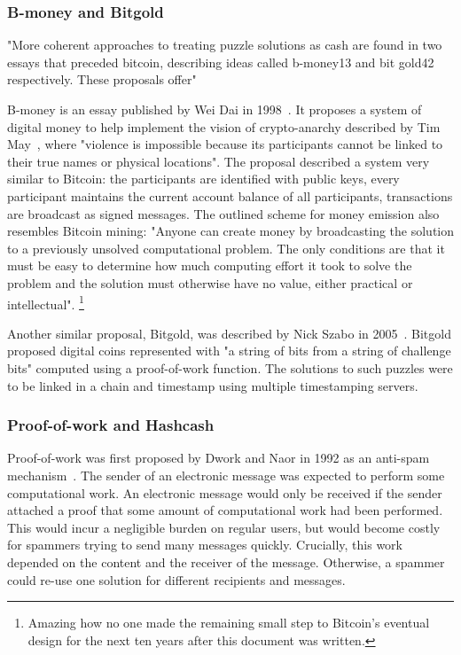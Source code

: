 \subsubsection*{B-money and Bitgold}

"More coherent approaches to treating puzzle solutions as cash are found in two essays that preceded bitcoin, describing ideas called b-money13 and bit gold42 respectively. These proposals offer"

B-money is an essay published by Wei Dai in 1998~\cite{Dai1998}.
It proposes a system of digital money to help implement the vision of crypto-anarchy described by Tim May~\cite{May1988}, where "violence is impossible because its participants cannot be linked to their true names or physical locations".
The proposal described a system very similar to Bitcoin: the participants are identified with public keys, every participant maintains the current account balance of all participants, transactions are broadcast as signed messages.
The outlined scheme for money emission also resembles Bitcoin mining: "Anyone can create money by broadcasting the solution to a previously unsolved computational problem. The only conditions are that it must be easy to determine how much computing effort it took to solve the problem and the solution must otherwise have no value, either practical or intellectual".
\footnote{Amazing how no one made the remaining small step to Bitcoin's eventual design for the next ten years after this document was written.}

Another similar proposal, Bitgold, was described by Nick Szabo in 2005~\cite{Szabo2005}.
Bitgold proposed digital coins represented with "a string of bits from a string of challenge bits" computed using a proof-of-work function.
The solutions to such puzzles were to be linked in a chain and timestamp using multiple timestamping servers.

\subsubsection*{Proof-of-work and Hashcash}

Proof-of-work was first proposed by Dwork and Naor in 1992 as an anti-spam mechanism~\cite{Dwork1992}.
The sender of an electronic message was expected to perform some computational work.
An electronic message would only be received if the sender attached a proof that some amount of computational work had been performed.
This would incur a negligible burden on regular users, but would become costly for spammers trying to send many messages quickly.
Crucially, this work depended on the content and the receiver of the message.
Otherwise, a spammer could re-use one solution for different recipients and messages.

